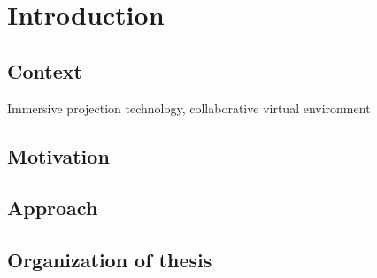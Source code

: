 \chapter*{Introduction}
\mtcaddchapter[Introduction]

\section*{Context}

Immersive projection technology, collaborative virtual environment

\section*{Motivation}

\section*{Approach}

\section*{Organization of thesis}
